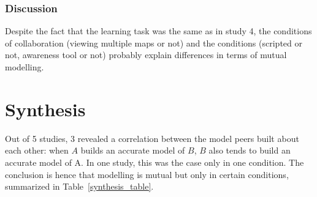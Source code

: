 \documentclass[twocolumn]{article}
\begin{document}
\subsubsection*{Discussion}

Despite the fact that the learning task was the same as in study 4, the
conditions of collaboration (viewing multiple maps or not) and the conditions
(scripted or not, awareness tool or not) probably explain differences in terms
of mutual modelling.

\section{Synthesis}

Out of 5 studies, 3 revealed a correlation between the model peers built about
each other: when $A$ builds an accurate model of $B$, $B$ also tends to build an
accurate model of A.  In one study, this was the case only in one condition.
The conclusion is hence that modelling is mutual but only in certain conditions,
summarized in Table~\ref{synthesis_table}.
\end{document}
